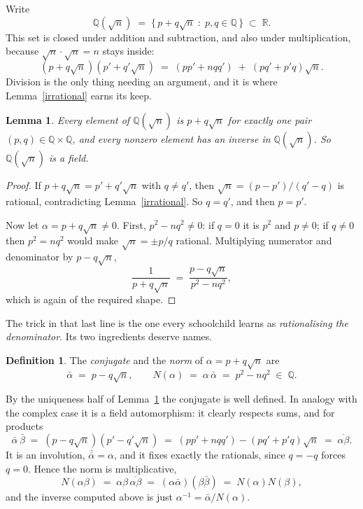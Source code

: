 \documentclass[12pt,a4paper]{article}
\theoremstyle{plain}
\newtheorem{lemma}[theorem]{Lemma}
\theoremstyle{definition}
\newtheorem{definition}[theorem]{Definition}
\begin{document}
Write
\[
  \mathbb{Q}(\sqrt n) \;=\; \bigl\{\, p + q\sqrt n \;:\; p, q \in \mathbb{Q}
    \,\bigr\} \;\subset\; \mathbb{R} .
\]
This set is closed under addition and subtraction, and also under
multiplication, because $\sqrt n \cdot \sqrt n = n$ stays inside:
\[
  (p + q\sqrt n)(p' + q'\sqrt n)
    \;=\; (pp' + nqq') \;+\; (pq' + p'q)\sqrt n .
\]
Division is the only thing needing an argument, and it is where
Lemma~\ref{irrational} earns its keep.

\begin{lemma}\label{basis}
Every element of $\mathbb{Q}(\sqrt n)$ is $p + q\sqrt n$ for exactly one pair
$(p,q) \in \mathbb{Q} \times \mathbb{Q}$, and every nonzero element has an
inverse in $\mathbb{Q}(\sqrt n)$. So $\mathbb{Q}(\sqrt n)$ is a field.
\end{lemma}

\begin{proof}
If $p + q\sqrt n = p' + q'\sqrt n$ with $q \neq q'$, then
$\sqrt n = (p - p')/(q' - q)$ is rational, contradicting
Lemma~\ref{irrational}. So $q = q'$, and then $p = p'$.

Now let $\alpha = p + q\sqrt n \neq 0$. First, $p^2 - nq^2 \neq 0$: if $q = 0$
it is $p^2$ and $p \neq 0$; if $q \neq 0$ then $p^2 = nq^2$ would make
$\sqrt n = \pm p/q$ rational. Multiplying numerator and denominator by
$p - q\sqrt n$,
\[
  \frac{1}{p + q\sqrt n} \;=\; \frac{p - q\sqrt n}{p^2 - nq^2} ,
\]
which is again of the required shape.
\end{proof}

The trick in that last line is the one every schoolchild learns as
\emph{rationalising the denominator}. Its two ingredients deserve names.

\begin{definition}
The \emph{conjugate} and the \emph{norm} of $\alpha = p + q\sqrt n$ are
\[
  \bar\alpha \;=\; p - q\sqrt n ,
  \qquad
  N(\alpha) \;=\; \alpha\,\bar\alpha \;=\; p^2 - nq^2 \;\in\; \mathbb{Q} .
\]
\end{definition}

\noindent
By the uniqueness half of Lemma~\ref{basis} the conjugate is well defined. In
analogy with the complex case it is a field automorphism: it clearly respects
sums, and for products
\[
  \bar\alpha\,\bar\beta \;=\; (p - q\sqrt n)(p' - q'\sqrt n)
    \;=\; (pp' + nqq') - (pq' + p'q)\sqrt n
    \;=\; \overline{\alpha\beta} .
\]
It is an involution, $\bar{\bar\alpha} = \alpha$, and it fixes exactly the
rationals, since $q = -q$ forces $q = 0$. Hence the norm is multiplicative,
\[
  N(\alpha\beta) \;=\; \alpha\beta\,\overline{\alpha\beta}
    \;=\; (\alpha\bar\alpha)(\beta\bar\beta) \;=\; N(\alpha)N(\beta) ,
\]
and the inverse computed above is just $\alpha^{-1} = \bar\alpha/N(\alpha)$.
\end{document}
